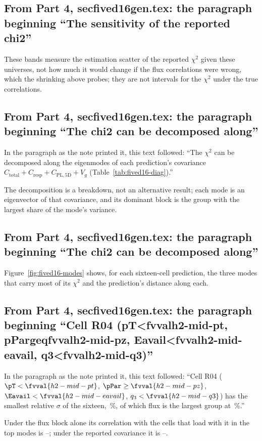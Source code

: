 \subsection{From Part 4, secfived16gen.tex: the paragraph beginning ``The sensitivity of the reported chi2''}
These bands measure the estimation scatter of the reported $\chi^2$ given these universes, not how much it would change if the flux correlations were wrong, which the shrinking above probes; they are not intervals for the $\chi^2$ under the true correlations.

\subsection{From Part 4, secfived16gen.tex: the paragraph beginning ``The chi2 can be decomposed along''}
In the paragraph as the note printed it, this text followed: ``The $\chi^2$ can be decomposed along the eigenmodes of each prediction's covariance $C_{\mathrm{total}}+C_{\mathrm{resp}}+C_{\mathrm{PL,5D}}+V_g$ (Table~\ref{tab:fived16-diag}).''\par
The decomposition is a breakdown, not an alternative result; each mode is an eigenvector of that covariance, and its dominant block is the group with the largest share of the mode's variance.

\subsection{From Part 4, secfived16gen.tex: the paragraph beginning ``The chi2 can be decomposed along''}
Figure~\ref{fig:fived16-modes} shows, for each sixteen-cell prediction, the three modes that carry most of its $\chi^2$ and the prediction's distance along each.

\subsection{From Part 4, secfived16gen.tex: the paragraph beginning ``Cell R04 (pT<fvvalh2-mid-pt, pPargeqfvvalh2-mid-pz, Eavail<fvvalh2-mid-eavail, q3<fvvalh2-mid-q3)''}
In the paragraph as the note printed it, this text followed: ``Cell R04 ($\pT<\fvval{h2-mid-pt}$, $\pPar\geq\fvval{h2-mid-pz}$, $\Eavail<\fvval{h2-mid-eavail}$, $q_3<\fvval{h2-mid-q3}$) has the smallest relative $\sigma$ of the sixteen, \,\%, of which flux is the largest group at \,\%.''\par
Under the flux block alone its correlation with the  cells that load with it in the top modes is --; under the reported covariance it is --.

